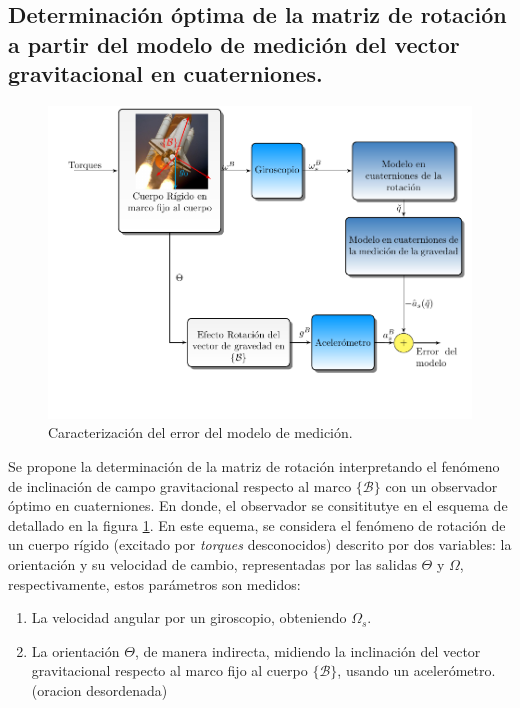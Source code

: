 \documentclass[conference]{IEEEtran}
\newcommand{\marco}[1]{\{\mathcal{#1}\}}
\begin{document}
\subsection{Determinación óptima de la matriz de rotación a partir del modelo de medición del vector gravitacional en cuaterniones.}
\begin{figure} [t]
\begin{center}
\includegraphics[scale=0.50,viewport=20 50 430 330,clip]{ObsOptimo_fig3.pdf}
\caption{Caracterización del error del modelo de medición.}
\label{ObsOptimo_fig2}
\end{center}
\end{figure}
Se propone la determinación de la matriz de rotación interpretando el fenómeno de inclinación de campo gravitacional respecto al marco $\marco{B}$ con un observador óptimo en cuaterniones. En donde, el observador se consititutye en el esquema de detallado en la figura \ref{ObsOptimo_fig2}. En este equema, se considera el fenómeno de rotación de un cuerpo rígido (excitado por \emph{torques} desconocidos) descrito por dos variables: la orientación y su velocidad de cambio, representadas por las salidas $\Theta$ y $\Omega$, respectivamente, estos parámetros son medidos:
\begin{enumerate} 
\item La velocidad angular por un giroscopio, obteniendo $\Omega_s$.
\item La orientación $\Theta$, de manera indirecta, midiendo la inclinación del vector gravitacional respecto al marco fijo al cuerpo $\marco{B}$, usando un acelerómetro.(oracion desordenada)
\end{enumerate}
\end{document}
